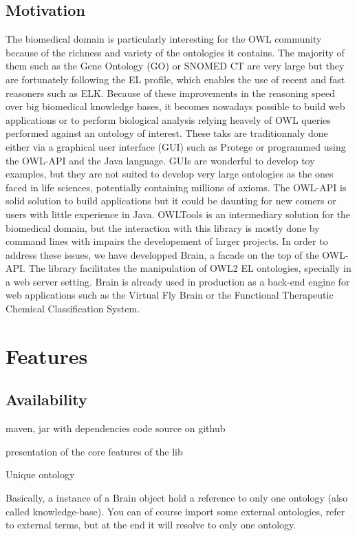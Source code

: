 \documentclass{llncs}
\begin{document}
\subsection{Motivation}
The biomedical domain is particularly interesting for the OWL community because of the richness and variety of the ontologies it contains.
The majority of them such as the Gene Ontology (GO) or SNOMED CT are very large but they are fortunately following 
the EL profile, which enables the use of recent and fast reasoners such as ELK.
Because of these improvements in the reasoning speed over big biomedical knowledge bases, 
it becomes nowadays possible to build web applications or to perform biological analysis relying heavely of OWL queries performed against
an ontology of interest. These taks are traditionnaly done either via a graphical user interface (GUI) such as Protege or programmed
using the OWL-API and the Java language. GUIs are wonderful to develop toy examples, but they are not suited to develop very large 
ontologies as the ones faced in life sciences, potentially containing millions of axioms. The OWL-API is solid solution to build
applications but it could be daunting for new comers or users with little experience in Java. OWLTools is an intermediary solution for the
biomedical domain, but the interaction with this library is mostly done by command lines with impairs the developement of larger projects.
In order to address these issues, we have developped Brain, a facade on the top of the OWL-API. The library facilitates the
manipulation of OWL2 EL ontologies, specially in a web server setting. 
Brain is already used in production as a back-end engine for web applications such as the Virtual Fly Brain or the Functional 
Therapeutic Chemical Classification System.

\section{Features}



\subsection{Availability}

maven, jar with dependencies
code source on github

presentation of the core features of the lib

Unique ontology

Basically, a instance of a Brain object hold a reference to only one 
ontology (also called knowledge-base). You can of course import some external 
ontologies, refer to external terms, but at the end it will resolve to only one ontology.
\end{document}
